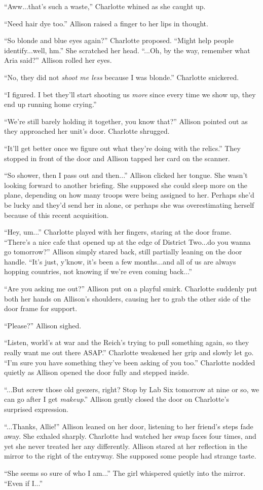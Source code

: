 \begin{Standard}
``Aww...that's such a waste,'' Charlotte whined as she caught up.

``Need hair dye too.'' Allison raised a finger to her lips in thought.

``So blonde and blue eyes again?'' Charlotte proposed. ``Might help people
identify...well, hm.'' She scratched her head. ``...Oh, by the way, remember what
Aria said?'' Allison rolled her eyes.

``No, they did not \emph{shoot me less} because I was blonde.'' Charlotte snickered.

``I figured. I bet they'll start shooting us \emph{more} since every time we show up,
they end up running home crying.''

``We're still barely holding it together, you know that?'' Allison pointed out as they
approached her unit's door. Charlotte shrugged.

``It'll get better once we figure out what they're doing with the relics.'' They stopped
in front of the door and Allison tapped her card on the scanner.

``So shower, then I pass out and then...'' Allison clicked her tongue. She wasn't
looking forward to another briefing. She supposed she could sleep more on the plane,
depending on how many troops were being assigned to her. Perhaps she'd be lucky
and they'd send her in alone, or perhaps she was overestimating herself because
of this recent acquisition.

``Hey, um...'' Charlotte played with her fingers, staring at the door frame.
``There's a nice cafe that opened up at the edge of District Two...do you wanna
go tomorrow?'' Allison simply stared back, still partially leaning on the door handle.
``It's just, y'know, it's been a few months...and all of us are always hopping
countries, not knowing if we're even coming back...''

``Are you asking me out?'' Allison put on a playful smirk. Charlotte suddenly put
both her hands on Allison's shoulders, causing her to grab the other side of the
door frame for support.

``Please?'' Allison sighed.

``Listen, world's at war and the Reich's trying to pull something again, so they
really want me out there ASAP.'' Charlotte weakened her grip and slowly let go.
``I'm sure you have something they've been asking of you too.'' Charlotte
nodded quietly as Allison opened the door fully and stepped inside.

``...But screw those old geezers, right? Stop by Lab Six tomorrow at nine or so,
we can go after I get \emph{makeup}.'' Allison gently closed the door on
Charlotte's surprised expression.

``...Thanks, Allie!'' Allison leaned on her door, listening to her friend's steps
fade away. She exhaled sharply. Charlotte had watched her swap faces four times,
and yet she never treated her any differently. Allison stared at her reflection
in the mirror to the right of the entryway. She supposed some people had
strange taste.

``She seems so sure of who I am...'' The girl whispered quietly into the mirror.
``Even if I...''
\end{Standard}
